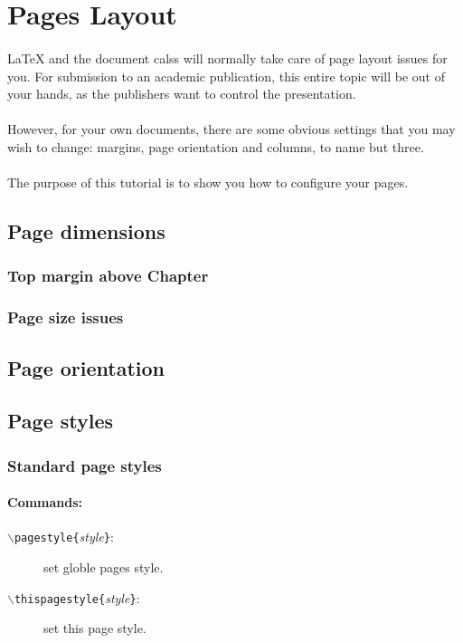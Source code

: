 \section{Pages Layout}
\paragraph{}
\LaTeX{} and the document calss will normally take care of page layout issues for you.
For submission to an academic publication, this entire topic will be out of your hands,
as the publishers want to control the presentation.
\paragraph{}
However, for your own documents, there are some obvious settings that you may wish to
change: margins, page orientation and columns, to name but three.
\paragraph{}
The purpose of this tutorial is to show you how to configure
your pages.

\subsection{Page dimensions}
\subsubsection{Top margin above Chapter}
\subsubsection{Page size issues}



\subsection{Page orientation}
\subsection{Page styles}
\subsubsection{Standard page styles}

\paragraph{Commands:}
\begin{description}
	\item[\texttt{$\backslash$pagestyle\{}\emph{style}\texttt{\}}:] set globle pages style.
	\item[\texttt{$\backslash$thispagestyle\{}\emph{style}\texttt{\}}:] set this page style.
\end{description}

